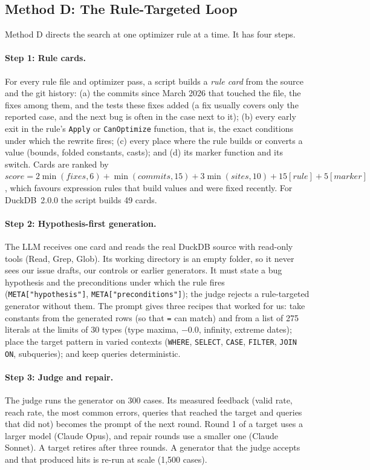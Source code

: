 \subsection{Method D: The Rule-Targeted Loop}
\label{sec:method-d}

Method D directs the search at one optimizer rule at a time. It has four steps.

\paragraph{Step 1: Rule cards.} For every rule file and optimizer pass, a script builds a \emph{rule card} from the
source and the git history: (a) the commits since March 2026 that touched the file, the fixes among them, and the tests these fixes added (a fix usually covers only the reported case, and the next bug is often in the case next to it); (b)
every early exit in the rule's \texttt{Apply} or \texttt{CanOptimize} function, that is, the exact conditions under
which the rewrite fires; (c) every place where the rule builds or converts a value (bounds, folded constants, casts);
and (d) its marker function and its switch. Cards are ranked by
$\mathit{score} = 2\min(\mathit{fixes},6) + \min(\mathit{commits},15) + 3\min(\mathit{sites},10) + 15[\mathit{rule}] +
5[\mathit{marker}]$, which favours expression rules that build values and were fixed recently. For DuckDB~2.0.0 the
script builds 49 cards.

\paragraph{Step 2: Hypothesis-first generation.} The LLM receives one card and reads the real DuckDB source with
read-only tools (Read, Grep, Glob). Its working directory is an empty folder, so it never sees our issue drafts,
our controls or earlier generators. It must state a bug hypothesis and the preconditions under which the rule fires
(\texttt{META["hypothesis"]}, \texttt{META["preconditions"]}); the judge rejects a rule-targeted generator without
them. The prompt gives three recipes that worked for us: take constants from the generated rows (so that \texttt{=}
can match) and from a list of 275 literals at the limits of 30 types (type maxima, $-0.0$, infinity, extreme dates);
place the target pattern in varied contexts (\texttt{WHERE}, \texttt{SELECT}, \texttt{CASE}, \texttt{FILTER},
\texttt{JOIN ON}, subqueries); and keep queries deterministic.

\paragraph{Step 3: Judge and repair.} The judge runs the generator on 300 cases. Its measured feedback (valid rate,
reach rate, the most common errors, queries that reached the target and queries that did not) becomes the prompt of the
next round. Round 1 of a target uses a larger model (Claude Opus), and repair rounds use a smaller one (Claude Sonnet).
A target retires after three rounds. A generator that the judge accepts and that produced hits is re-run at scale
(1{,}500 cases).

